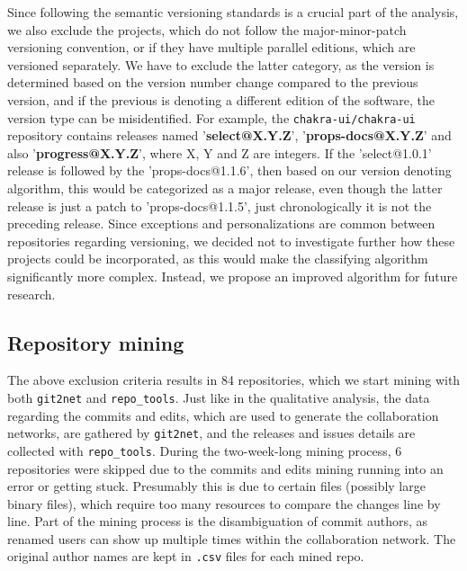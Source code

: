 Since following the semantic versioning standards is a crucial part of the analysis, we also exclude the projects, which do not follow the major-minor-patch versioning convention, or if they have multiple parallel editions, which are versioned separately. We have to exclude the latter category, as the version is determined based on the version number change compared to the previous version, and if the previous is denoting a different edition of the software, the version type can be misidentified. For example, the \texttt{chakra-ui/chakra-ui} repository contains releases named '\textbf{select@X.Y.Z}', '\textbf{props-docs@X.Y.Z}' and also '\textbf{progress@X.Y.Z}', where X, Y and Z are integers. If the 'select@1.0.1' release is followed by the 'props-docs@1.1.6', then based on our version denoting algorithm, this would be categorized as a major release, even though the latter release is just a patch to 'props-docs@1.1.5', just chronologically it is not the preceding release. Since exceptions and personalizations are common between repositories regarding versioning, we decided not to investigate further how these projects could be incorporated, as this would make the classifying algorithm significantly more complex. Instead, we propose an improved algorithm for future research.

\subsection{Repository mining}

The above exclusion criteria results in 84 repositories, which we start mining with both \texttt{git2net} and \texttt{repo\_tools}. Just like in the qualitative analysis, the data regarding the commits and edits, which are used to generate the collaboration networks, are gathered by \texttt{git2net}, and the releases and issues details are collected with \texttt{repo\_tools}. During the two-week-long mining process, 6 repositories were skipped due to the commits and edits mining running into an error or getting stuck. Presumably this is due to certain files (possibly large binary files), which require too many resources to compare the changes line by line. Part of the mining process is the disambiguation of commit authors, as renamed users can show up multiple times within the collaboration network. The original author names are kept in \texttt{.csv} files for each mined repo.

